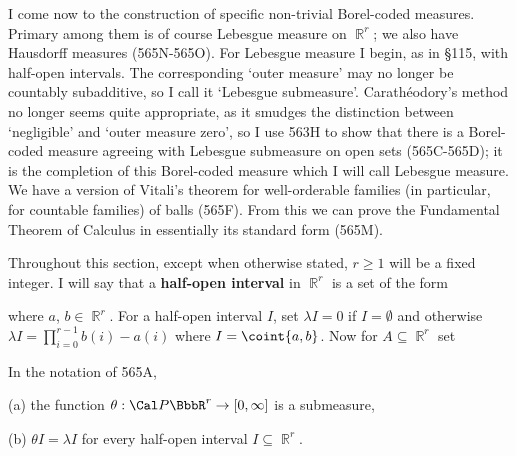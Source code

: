 
\def\chaptername{Choice and determinacy}
\def\sectionname{Lebesgue measure without choice}


I come now to the construction of specific
non-trivial Borel-coded measures.
Primary among them is of course Lebesgue measure on $\BbbR^r$;  we also
have Hausdorff measures (565N-565O).   For Lebesgue
measure I begin, as in \S115, with
half-open intervals.   The corresponding `outer measure' may no longer be
countably subadditive, so I call it `Lebesgue submeasure'.
Carath\'eodory's method no longer seems quite appropriate, as it smudges
the distinction between `negligible' and `outer measure zero', so I use
563H to show that there is a Borel-coded measure agreeing with Lebesgue
submeasure on open sets (565C-565D);  it is the completion of this
Borel-coded measure which I will call Lebesgue measure.
We have a version of Vitali's theorem for well-orderable families
(in particular, for countable families)  of balls (565F).   From this we
can prove the Fundamental Theorem of Calculus in essentially its standard
form (565M).

 Throughout this section, except when otherwise
stated, $r\ge 1$ will be a
fixed integer.   I will say that a 
{\bf half-open interval} in $\BbbR^r$ is a set of the form


\noindent where $a$, $b\in\BbbR^r$.
For a half-open interval $I$, set $\lambda I=0$ if $I=\emptyset$
and otherwise $\lambda I=\prod_{i=0}^{r-1}b(i)-a(i)$ where $I=\coint{a,b}$.
Now for $A\subseteq\BbbR^r$ set


 In the notation of 565A,

(a) the function
$\theta:\Cal P\BbbR^r\to[0,\infty]$ is a submeasure,

(b) $\theta I=\lambda I$ for every half-open interval $I\subseteq\BbbR^r$.

